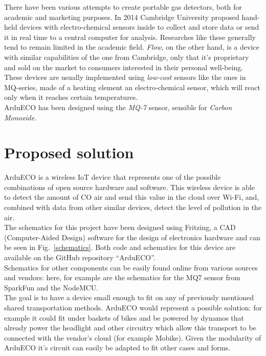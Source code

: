 \documentclass[conference]{IEEEtran}
\begin{document}
	There have been various attempts to create portable gas detectors, both for academic and marketing purposes.
	In 2014 Cambridge University proposed hand-held devices with electro-chemical sensors inside to collect and store data or send it in real time to a central computer for analysis\cite{cambridge}.
	Researches like these generally tend to remain limited in the academic field.
	\textit{Flow}\cite{flow}, on the other hand, is a device with similar capabilities of the one from Cambridge, only that it's proprietary and sold on the market to consumers interested in their personal well-being.\\
	These devices are usually implemented using \textit{low-cost} sensors like the ones in MQ-series, made of a heating element an electro-chemical sensor, which will react only when it reaches certain temperatures.\\
	ArduECO has been designed using the \textit{MQ-7} sensor, sensible for \textit{Carbon Monoxide}.
	
\section{Proposed solution}\label{solution}
	
	ArduECO is a wireless IoT device that represents one of the possible combinations of open source hardware and software.
	This wireless device is able to detect the amount of CO air and send this value in the cloud over Wi-Fi, and, combined with data from other similar devices, detect the level of pollution in the air.\\
	The schematics for this project have been designed using Fritzing, a CAD (Computer-Aided Design) software for the design of electronics hardware\cite{fritzing} and can be seen in Fig.~\ref{schematics}.
	Both code and schematics for this device are available on the GitHub repository ``ArduECO''\cite{ardueco_git}.\\
	Schematics for other components can be easily found online from various sources and vendors: here, for example are the schematics for the MQ7 sensor from SparkFun\cite{spark_mq} and the NodeMCU\cite{node_scheme}.\\
	The goal is to have a device small enough to fit on any of previously mentioned shared transportation methods.
	ArduECO would represent a possible solution: for example it could fit under baskets of bikes and be powered by dynamos that already power the headlight and other circuitry which allow this transport to be connected with the vendor's cloud (for example Mobike).
	Given the modularity of ArduECO it's circuit can easily be adapted to fit other cases and forms.
	
\end{document}
